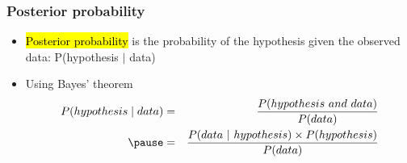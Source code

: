 \documentclass[slidestop,compress,mathserif,12pt,t,professionalfonts,xcolor=table]{beamer}
\begin{document}
















\begin{frame}
\frametitle{Posterior probability}

\begin{itemize}

\item \hl{Posterior probability} is the probability of the hypothesis given the observed data: P(hypothesis $|$ data)

\pause

\item Using Bayes' theorem
\begin{eqnarray*}
P(hypothesis \mid data) &=& \frac{P(hypothesis~and~data)}{P(data)} \\
\pause
&=& \frac{P(data~|~hypothesis) \times P(hypothesis)}{P(data)}
\end{eqnarray*}

\end{itemize}

\end{frame}
\end{document}
